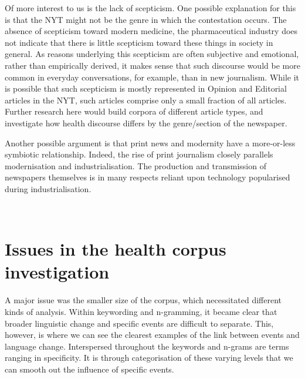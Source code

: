 Of more interest to us is the lack of scepticism. One possible explanation for this is that the NYT might not be the genre in which the contestation occurs. The absence of scepticism toward modern medicine, the pharmaceutical industry does not indicate that there is little scepticism toward these things in society in general. As reasons underlying this scepticism are often subjective and emotional, rather than empirically derived, it makes sense that such discourse would be more common in everyday conversations, for example, than in new journalism. While it is possible that such scepticism is mostly represented in Opinion and Editorial articles in the NYT, such articles comprise only a small fraction of all articles. Further research here would build corpora of different article types, and investigate how health discourse differs by the genre\slash section of the newspaper.

Another possible argument is that print news and modernity have a more-or-less symbiotic relationship. Indeed, the rise of print journalism closely parallels modernisation and industrialisation. The production and transmission of newspapers themselves is in many respects reliant upon technology popularised during industrialisation.




~\ 

\section{Issues in the health corpus investigation}

A major issue was the smaller size of the corpus, which necessitated different kinds of analysis. Within keywording and n-gramming, it became clear that broader linguistic change and specific events are difficult to separate. This, however, is where we can see the clearest examples of the link between events and language change. Interspersed throughout the keywords and n-grams are terms ranging in specificity. It is through categorisation of these varying levels that we can smooth out the influence of specific events.

